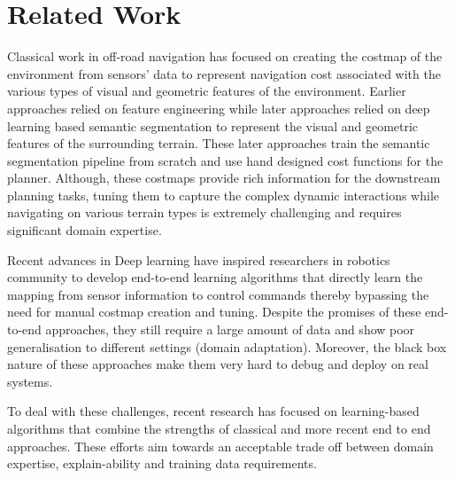 \section{Related Work}
Classical work in off-road navigation \cite{kellyReliableRoadAutonomous2006,kimTraversabilityClassificationUGV2007,thrunWinningDARPAGrand2006,manduchiObstacleDetectionTerrain2005,procopioTerrainSegmentationOnLine2009} has focused on creating the costmap 
of the environment from sensors' data to represent navigation cost associated
with the various types of visual and geometric features of the environment. 
Earlier approaches \cite{kellyReliableRoadAutonomous2006,thrunWinningDARPAGrand2006}
relied on feature engineering while later approaches
\cite{maturanaRealTimeSemanticMapping2018,valadaDeepMultispectralSemantic2017} relied on deep learning based 
semantic segmentation to represent the visual and geometric features of the surrounding terrain. These later approaches 
train the semantic segmentation pipeline from scratch and use hand designed cost functions for the planner. 
Although, these costmaps provide rich information for the downstream planning tasks, 
tuning them to capture the complex dynamic interactions while navigating on various terrain types is extremely challenging and requires significant domain expertise.  


Recent advances in Deep learning 
have inspired researchers in robotics community to develop end-to-end learning algorithms\cite{bajracharyaAutonomousRoadNavigation2009,kahnBADGRAutonomousSelfSupervised2020} that 
directly learn the mapping from sensor information to control commands thereby bypassing 
the need for manual costmap creation and tuning. Despite the promises of these end-to-end approaches, they still require a large amount of data and show poor generalisation to different settings (domain adaptation). Moreover, the black box nature of these approaches make them very hard to debug and deploy on real systems.

To deal with these challenges, recent research has focused on learning-based algorithms that combine the strengths of classical and more recent end to end approaches. These efforts aim towards an acceptable trade off between domain expertise, explain-ability and training data requirements. 

